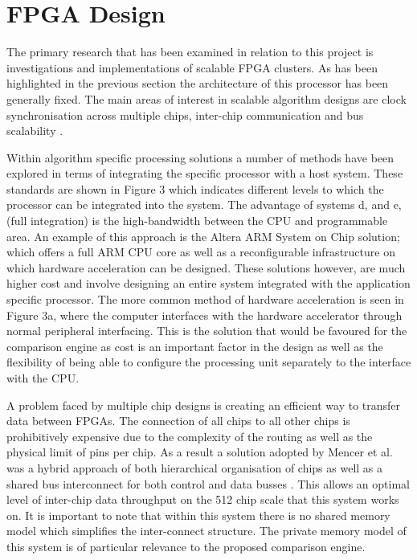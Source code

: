 \section{FPGA Design} 


The primary research that has been examined in relation to this project is investigations and implementations of scalable FPGA clusters. As has been highlighted in the previous section the architecture of this processor has been generally fixed. The main areas of interest in scalable algorithm designs are clock synchronisation across multiple chips, inter-chip communication and bus scalability \cite{mencer2009cube}. 


Within algorithm specific processing solutions a number of methods have been explored in terms of integrating the specific processor with a host system.  These standards are shown in Figure 3 \cite{todman2005reconfigurable}  which indicates different levels to which the processor can be integrated into the system. The advantage of systems d, and e, (full integration) is the high-bandwidth between the CPU and programmable area. An example of this approach is the Altera ARM System on Chip solution; which offers a full ARM CPU core as well as a reconfigurable infrastructure on which hardware acceleration can be designed. These solutions however, are much higher cost and involve designing an entire system integrated with the application specific processor. The more common method of hardware acceleration is seen in Figure 3a, where the computer interfaces with the hardware accelerator through normal peripheral interfacing. This is the solution that would be favoured for the comparison engine as cost is an important factor in the design as well as the flexibility of being able to configure the processing unit separately to the interface with the CPU. 



A problem faced by multiple chip designs is creating an efficient way to transfer data between FPGAs. The connection of all chips to all other chips is prohibitively expensive due to the complexity of the routing as well as the physical limit of pins per chip. As a result a solution adopted by Mencer et al. was a hybrid approach of both hierarchical organisation of chips as well as a shared bus interconnect for both control and data busses \cite{mencer2009cube}. This allows an optimal level of inter-chip data throughput on the 512 chip scale that this system works on. It is important to note that within this system there is no shared memory model which simplifies the inter-connect structure. The private memory model of this system is of particular relevance to the proposed comparison engine. 
 
